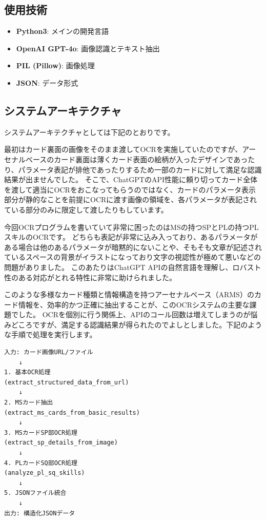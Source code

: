 \subsection*{使用技術}
\begin{itemize}
    \item \textbf{Python3}: メインの開発言語
    \item \textbf{OpenAI GPT-4o}: 画像認識とテキスト抽出
    \item \textbf{PIL (Pillow)}: 画像処理
    \item \textbf{JSON}: データ形式
\end{itemize}

\subsection*{システムアーキテクチャ}
システムアーキテクチャとしては下記のとおりです。

最初はカード裏面の画像をそのまま渡してOCRを実施していたのですが、アーセナルベースのカード裏面は薄くカード表面の絵柄が入ったデザインであったり、パラメータ表記が排他であったりするため一部のカードに対して満足な認識結果が出ませんでした。
そこで、ChatGPTのAPI性能に頼り切ってカード全体を渡して適当にOCRをおこなってもらうのではなく、カードのパラメータ表示部分が静的なことを前提にOCRに渡す画像の領域を、各パラメータが表記されている部分のみに限定して渡したりもしています。

今回OCRプログラムを書いていて非常に困ったのはMSの持つSPとPLの持つPLスキルのOCRです。
どちらも表記が非常に込み入っており、あるパラメータがある場合は他のあるパラメータが暗黙的にないことや、そもそも文章が記述されているスペースの背景がイラストになっており文字の視認性が極めて悪いなどの問題がありました。
このあたりはChatGPT APIの自然言語を理解し、ロバスト性のある対応がとれる特性に非常に助けられました。

このような多様なカード種類と情報構造を持つアーセナルベース（ARMS）のカード情報を、効率的かつ正確に抽出することが、このOCRシステムの主要な課題でした。
OCRを個別に行う関係上、APIのコール回数は増えてしまうのが悩みどころですが、満足する認識結果が得られたのでよしとしました。下記のような手順で処理を実行します。


\begin{verbatim}
入力: カード画像URL/ファイル
    ↓
1. 基本OCR処理 
(extract_structured_data_from_url)
    ↓
2. MSカード抽出 
(extract_ms_cards_from_basic_results)
    ↓
3. MSカードSP部OCR処理 
(extract_sp_details_from_image)
    ↓
4. PLカードSQ部OCR処理 
(analyze_pl_sq_skills)
    ↓
5. JSONファイル統合
    ↓
出力: 構造化JSONデータ
\end{verbatim}

